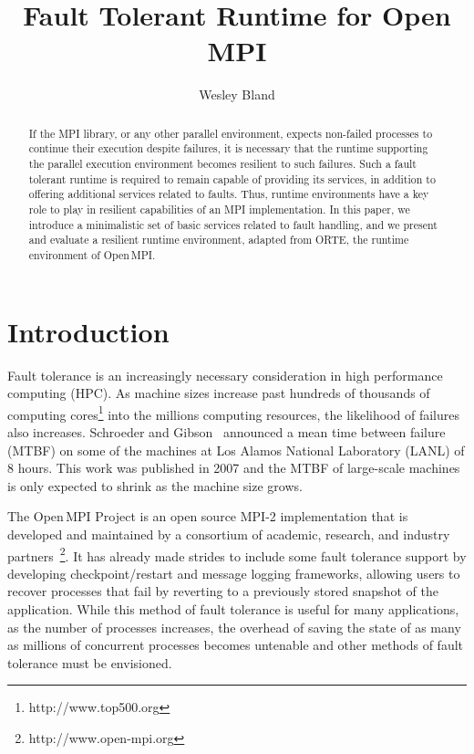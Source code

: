 \documentclass{llncs}
\newcommand{\ompi}{Open\,MPI\xspace}
\begin{document}
\title{Fault Tolerant Runtime for Open MPI}
\author{Wesley Bland}

\maketitle

\begin{abstract}
  If the MPI library, or any other parallel environment, expects
  non-failed processes to continue their execution despite failures,
  it is necessary that the runtime supporting the parallel execution
  environment becomes resilient to such failures. Such a fault
  tolerant runtime is required to remain capable of providing its
  services, in addition to offering additional services related to
  faults. Thus, runtime environments have a key role to play in
  resilient capabilities of an MPI implementation. In this paper, we
  introduce a minimalistic set of basic services related to fault
  handling, and we present and evaluate a resilient runtime
  environment, adapted from ORTE, the runtime environment of
  \ompi. \end{abstract}

\section{Introduction} \label{sect:introduction}

Fault tolerance is an increasingly necessary consideration in high
performance computing (HPC). As machine sizes increase past hundreds
of thousands of computing cores\footnote{http://www.top500.org} into
the millions computing resources, the likelihood of failures also
increases. Schroeder and Gibson~\cite{4775906} announced a mean time
between failure (MTBF) on some of the machines at Los Alamos National
Laboratory (LANL) of 8 hours. This work was published in 2007 and the
MTBF of large-scale machines is only expected to shrink as the machine
size grows.
	
The \ompi Project is an open source MPI-2 implementation that is
developed and maintained by a consortium of academic, research, and
industry partners~\footnote{http://www.open-mpi.org}. It has already
made strides to include some fault tolerance support by developing
checkpoint/restart and message logging frameworks, allowing users to
recover processes that fail by reverting to a previously stored
snapshot of the application. While this method of fault tolerance is
useful for many applications, as the number of processes increases,
the overhead of saving the state of as many as millions of concurrent
processes becomes untenable and other methods of fault tolerance must
be envisioned.
\end{document}
